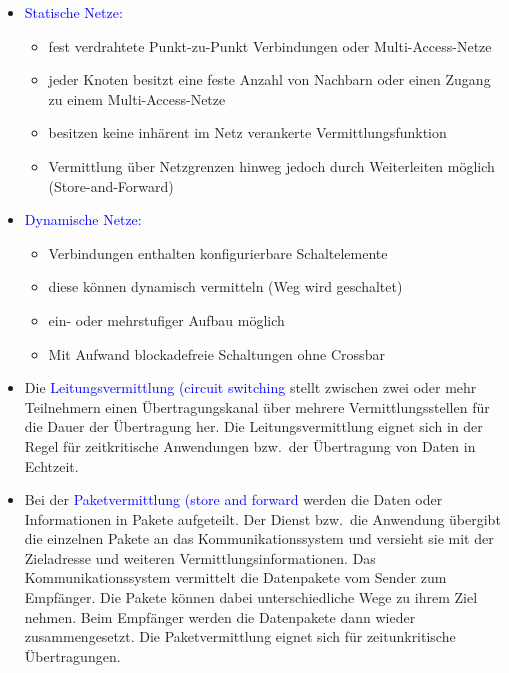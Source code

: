 \begin{itemize}
    \item \textcolor{blue}{Statische Netze:}
    \begin{itemize}
        \item fest verdrahtete Punkt-zu-Punkt Verbindungen oder Multi-Access-Netze
        \item jeder Knoten besitzt eine feste Anzahl von Nachbarn oder einen Zugang zu einem Multi-Access-Netze
        \item besitzen keine inhärent im Netz verankerte Vermittlungsfunktion
        \item Vermittlung über Netzgrenzen hinweg jedoch durch Weiterleiten möglich (Store-and-Forward)
    \end{itemize}
    \item \textcolor{blue}{Dynamische Netze:}
    \begin{itemize}
        \item Verbindungen enthalten konfigurierbare Schaltelemente
        \item diese können dynamisch vermitteln (Weg wird geschaltet)
        \item ein- oder mehrstufiger Aufbau möglich
        \item Mit Aufwand blockadefreie Schaltungen ohne Crossbar
    \end{itemize}
\end{itemize}

\begin{itemize}
    \item Die \textcolor{blue}{Leitungsvermittlung (circuit switching} stellt zwischen zwei oder mehr Teilnehmern einen Übertragungskanal über mehrere Vermittlungsstellen für die Dauer der Übertragung her.
    Die Leitungsvermittlung eignet sich in der Regel für zeitkritische Anwendungen bzw.\ der Übertragung von Daten in Echtzeit.
    \item Bei der  \textcolor{blue}{Paketvermittlung (store and forward} werden die Daten oder Informationen in Pakete aufgeteilt.
    Der Dienst bzw.\ die Anwendung übergibt die einzelnen Pakete an das Kommunikationssystem und versieht sie mit der Zieladresse und weiteren Vermittlungsinformationen.
    Das Kommunikationssystem vermittelt die Datenpakete vom Sender zum Empfänger.
    Die Pakete können dabei unterschiedliche Wege zu ihrem Ziel nehmen.
    Beim Empfänger werden die Datenpakete dann wieder zusammengesetzt.
    Die Paketvermittlung eignet sich für zeitunkritische Übertragungen.
\end{itemize}

